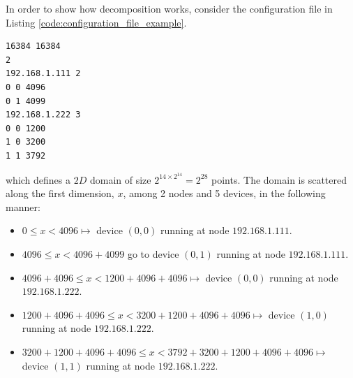  In order to show how decomposition works, consider the configuration file in Listing \ref{code:configuration_file_example}.
 \begin{minipage}{\linewidth}
\begin{lstlisting}
16384 16384
2
192.168.1.111 2  
0 0 4096
0 1 4099
192.168.1.222 3
0 0 1200
1 0 3200
1 1 3792
\end{lstlisting}
\end{minipage}
which defines a $2D$ domain of size $2^{{14} \times 2^{{14}}} = 2^{28}$ points.
The domain is scattered along the first dimension, $x$, among 2 nodes and 5 devices, in the following manner:
\begin{itemize}
    \item $0 \leq x < 4096 \longmapsto$  device $(0,0)$ running at node $192.168.1.111$.
    \item  $4096 \leq x < 4096+4099$ go to device $(0,1)$ running at node $192.168.1.111$.
    
    \item  $4096+4096\leq x < 1200+4096+4096 \longmapsto$  device $(0,0)$ running at node $192.168.1.222$.
    \item  $1200+4096+4096\leq x < 3200+1200+4096+4096 \longmapsto$  device $(1,0)$ running at node $192.168.1.222$.
    \item  $3200+1200+4096+4096\leq x < 3792+3200+1200+4096+4096 \longmapsto$  device $(1,1)$ running at node $192.168.1.222$.
\end{itemize}



